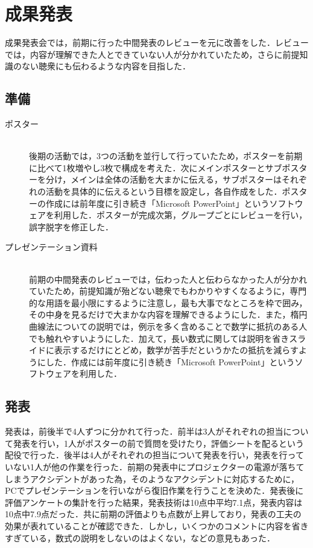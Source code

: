 \documentclass[openany,11pt,papersize]{jsbook}
\begin{document}
\section{成果発表}
成果発表会では，前期に行った中間発表のレビューを元に改善をした．レビューでは，内容が理解できた人とできていない人が分かれていたため，さらに前提知識のない聴衆にも伝わるような内容を目指した．

\subsection{準備}
\begin{description}
\item[ポスター]\mbox{}\\
後期の活動では，3つの活動を並行して行っていたため，ポスターを前期に比べて1枚増やし3枚で構成を考えた．次にメインポスターとサブポスターを分け，メインは全体の活動を大まかに伝える，サブポスターはそれぞれの活動を具体的に伝えるという目標を設定し，各自作成をした．ポスターの作成には前年度に引き続き「Microsoft PowerPoint」というソフトウェアを利用した．ポスターが完成次第，グループごとにレビューを行い，誤字脱字を修正した．

\item[プレゼンテーション資料]\mbox{}\\
前期の中間発表のレビューでは，伝わった人と伝わらなかった人が分かれていたため，前提知識が殆どない聴衆でもわかりやすくなるように，専門的な用語を最小限にするように注意し，最も大事でなところを枠で囲み，その中身を見るだけで大まかな内容を理解できるようにした．また，楕円曲線法についての説明では，例示を多く含めることで数学に抵抗のある人でも触れやすいようにした．加えて，長い数式に関しては説明を省きスライドに表示するだけにとどめ，数学が苦手だというかたの抵抗を減らすようにした．作成には前年度に引き続き「Microsoft PowerPoint」というソフトウェアを利用した．

\end{description}

\subsection{発表}
発表は，前後半で4人ずつに分かれて行った．前半は3人がそれぞれの担当について発表を行い，1人がポスターの前で質問を受けたり，評価シートを配るという配役で行った．後半は4人がそれぞれの担当について発表を行い，発表を行っていない1人が他の作業を行った．前期の発表中にプロジェクターの電源が落ちてしまうアクシデントがあった為，そのようなアクシデントに対応するために，PCでプレゼンテーションを行いながら復旧作業を行うことを決めた．発表後に評価アンケートの集計を行った結果，発表技術は10点中平均7.1点，発表内容は10点中7.9点だった．共に前期の評価よりも点数が上昇しており，発表の工夫の効果が表れていることが確認できた．しかし，いくつかのコメントに内容を省きすぎている，数式の説明をしないのはよくない，などの意見もあった．

\end{document}
